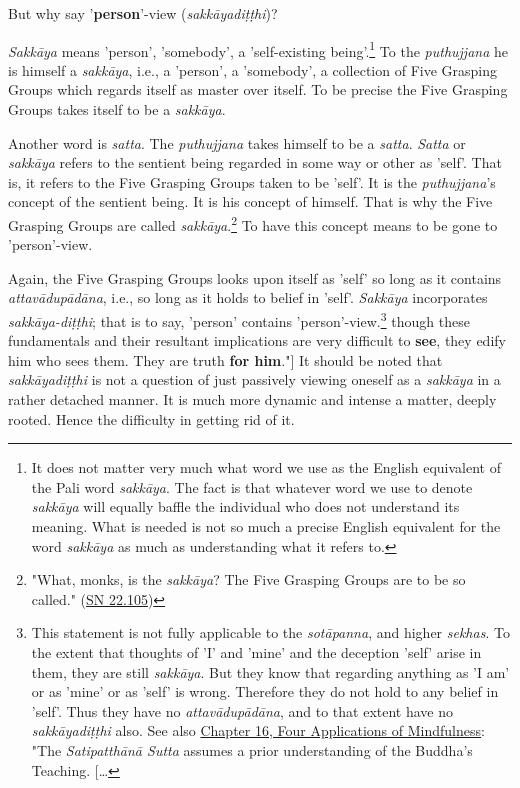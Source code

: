 But why say '\textbf{person}'-view (\emph{sakkāyadiṭṭhi})?


\emph{Sakkāya} means 'person', 'somebody', a 'self-existing
being'.\footnote{It does not matter very much what word we use as the English equivalent of the Pali word \emph{sakkāya}. The fact is that whatever word we use to denote \emph{sakkāya} will equally baffle the individual who does not understand its meaning. What is needed is not so much a precise English equivalent for the word \emph{sakkāya} as much as understanding what it refers to.} To the \emph{puthujjana} he is himself a
\emph{sakkāya}, i.e., a 'person', a 'somebody', a collection of Five
Grasping Groups which regards itself as master over itself. To be
precise the Five Grasping Groups takes itself to be a \emph{sakkāya}.


Another word is \emph{satta}. The \emph{puthujjana} takes himself to be a
\emph{satta}. \emph{Satta} or \emph{sakkāya} refers to the sentient being regarded in
some way or other as 'self'. That is, it refers to the Five Grasping
Groups taken to be 'self'. It is the \emph{puthujjana}'s concept of the
sentient being. It is his concept of himself. That is why the Five
Grasping Groups are called \emph{sakkāya}.\footnote{"What, monks, is the \emph{sakkāya}? The Five Grasping Groups are to be so called." (\href{https://suttacentral.net/sn22.105/en/sujato}{SN 22.105})}
To have this concept means to be gone to 'person'-view.


Again, the Five Grasping Groups looks upon itself as 'self' so long as
it contains \emph{attavādupādāna}, i.e., so long as it holds to belief in
'self'. \emph{Sakkāya} incorporates \emph{sakkāya-diṭṭhi}; that is to say,
'person' contains 'person'-view.\footnote{This statement is not fully applicable to the \emph{sotāpanna}, and higher \emph{sekhas}. To the extent that thoughts of 'I' and 'mine' and the deception 'self' arise in them, they are still \emph{sakkāya}. But they know that regarding anything as 'I am' or as 'mine' or as 'self' is wrong. Therefore they do not hold to any belief in 'self'. Thus they have no \emph{attavādupādāna}, and to that extent have no \emph{sakkāyadiṭṭhi} also. See also \hyperlink{ch-16-satipatthana#truth-for-him}{Chapter 16, Four Applications of Mindfulness}: "The \emph{Satipatthānā Sutta} assumes a prior understanding of the Buddha’s Teaching. […​}
though these fundamentals and their resultant implications are very difficult to \textbf{see},
they edify him who sees them. They are truth \textbf{for him}."]
It should be noted that \emph{sakkāyadiṭṭhi} is not a question of
just passively viewing oneself as a \emph{sakkāya} in a rather detached
manner. It is much more dynamic and intense a matter, deeply rooted.
Hence the difficulty in getting rid of it.



